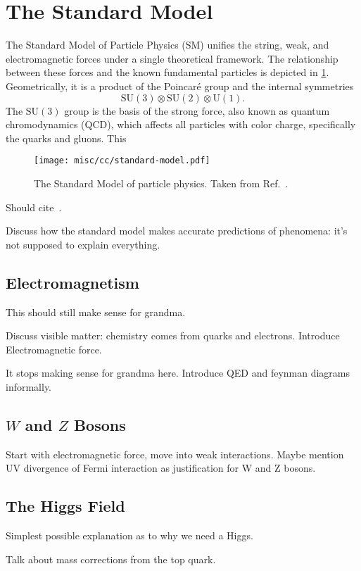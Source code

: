 \section{The Standard Model}
\label{sec:standard-model}
The Standard Model of Particle Physics (SM) unifies the string, weak, and electromagnetic forces under a single theoretical framework.
The relationship between these forces and the known fundamental particles is depicted in \cref{fig:sm}.
Geometrically, it is a product of the Poincar\'e group and the internal symmetries
\begin{equation}
  \mathrm{SU}(3) \otimes \mathrm{SU}(2) \otimes \mathrm{U}(1).
\end{equation}
The $\mathrm{SU}(3)$ group is the basis of the strong force, also known as quantum chromodynamics (QCD), which affects all particles with color charge, specifically the quarks and gluons.
This 

\begin{figure}
  \texttt{[image: misc/cc/standard-model.pdf]}
  \caption[The Standard Model of particle physics]{The Standard Model of particle physics. Taken from Ref.~\cite{smwiki}.}
  \label{fig:sm}
\end{figure}

Should cite~\cite{ewuv,ewgaugeinvariance,weakinthev}.

Discuss how the standard model makes accurate predictions of phenomena: it's not supposed to explain everything.
\subsection{Electromagnetism}

This should still make sense for grandma.

Discuss visible matter: chemistry comes from quarks and electrons. Introduce Electromagnetic force.

It stops making sense for grandma here. Introduce QED and feynman diagrams informally.

\subsection{$W$ and $Z$ Bosons}
Start with electromagnetic force, move into weak interactions. Maybe mention UV divergence of Fermi interaction as justification for W and Z bosons.
\subsection{The Higgs Field}
Simplest possible explanation as to why we need a Higgs.

Talk about mass corrections from the top quark.

